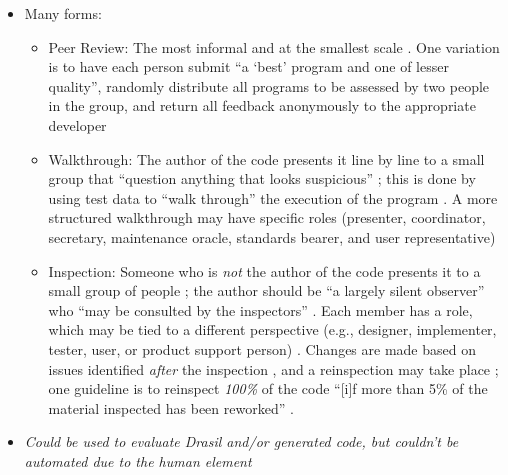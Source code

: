 \begin{itemize}
      \item Many forms:
            \begin{itemize}
                  \item Peer Review: The most informal and at the smallest scale
                        \cite[p.~94]{patton_software_2006}. One variation is to
                        have each person submit ``a `best' program and one of
                        lesser quality'', randomly distribute all programs to
                        be assessed by two people in the group, and return all
                        feedback anonymously to the appropriate developer
                        \cite[p.~414]{van_vliet_software_2000}
                  \item Walkthrough: The author of the code presents it line
                        by line to a small group that ``question anything that
                        looks suspicious'' \cite[p.~95]{patton_software_2006};
                        this is done by using test data to ``walk through''
                        the execution of the program
                        \cite[p.~416]{van_vliet_software_2000}. A more
                        structured walkthrough may have specific roles
                        (presenter, coordinator, secretary, maintenance oracle,
                        standards bearer, and user representative)
                        \cite[p.~484]{peters_software_2000}
                  \item Inspection: Someone who is \emph{not} the author of the
                        code presents it to a small group of people
                        \cite[p.~95]{patton_software_2006}; the author
                        should be ``a largely silent observer'' who
                        ``may be consulted by the inspectors''
                        \cite[p.~415]{van_vliet_software_2000}. Each member has
                        a role, which may be tied to a different perspective
                        (e.g., designer, implementer, tester,
                        \cite[p.~439]{peters_software_2000} user, or product
                        support person) \cite[p.~95]{patton_software_2006}.
                        Changes are made based on issues identified \emph{after}
                        the inspection \cite[p.~415]{van_vliet_software_2000},
                        and a reinspection may take place
                        \cite[p.~95]{patton_software_2006}; one guideline is to
                        reinspect \emph{100\%} of the code ``[i]f more than 5\%
                        of the material inspected has been reworked''
                        \cite[p.~483]{peters_software_2000}.
            \end{itemize}

      \item \emph{Could be used to evaluate Drasil and/or generated code, but
                  couldn't be automated due to the human element}

\end{itemize}

